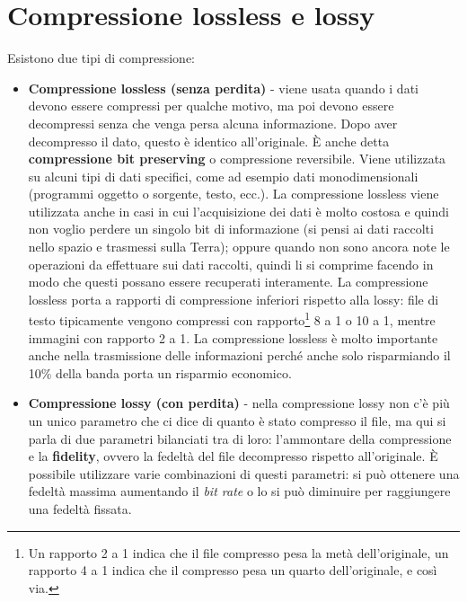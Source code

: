 \section{Compressione lossless e lossy}
Esistono due tipi di compressione:
\begin{itemize}
    \item \textbf{Compressione lossless (senza perdita)} - viene usata quando i dati devono essere compressi per qualche motivo, ma poi devono essere decompressi senza che venga persa alcuna informazione. Dopo aver decompresso il dato, questo è identico all'originale. È anche detta \textbf{compressione bit preserving} o compressione reversibile. Viene utilizzata su alcuni tipi di dati specifici, come ad esempio dati monodimensionali (programmi oggetto o sorgente, testo, ecc.). La compressione lossless viene utilizzata anche in casi in cui l'acquisizione dei dati è molto costosa e quindi non voglio perdere un singolo bit di informazione (si pensi ai dati raccolti nello spazio e trasmessi sulla Terra); oppure quando non sono ancora note le operazioni da effettuare sui dati raccolti, quindi li si comprime facendo in modo che questi possano essere recuperati interamente. La compressione lossless porta a rapporti di compressione inferiori rispetto alla lossy: file di testo tipicamente vengono compressi con rapporto\footnote{Un rapporto 2 a 1 indica che il file compresso pesa la metà dell'originale, un rapporto 4 a 1 indica che il compresso pesa un quarto dell'originale, e così via.} 8 a 1 o 10 a 1, mentre immagini con rapporto 2 a 1. La compressione lossless è molto importante anche nella trasmissione delle informazioni perché anche solo risparmiando il 10\% della banda porta un risparmio economico.
    \item \textbf{Compressione lossy (con perdita)} - nella compressione lossy non c'è più un unico parametro che ci dice di quanto è stato compresso il file, ma qui si parla di due parametri bilanciati tra di loro: l'ammontare della compressione e la \textbf{fidelity}, ovvero la fedeltà del file decompresso rispetto all'originale. È possibile utilizzare varie combinazioni di questi parametri: si può ottenere una fedeltà massima aumentando il \textit{bit rate} o lo si può diminuire per raggiungere una fedeltà fissata. 
\end{itemize}


\let\cleardoublepage\clearpage